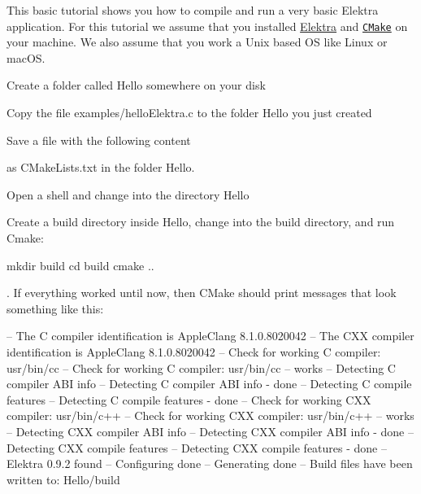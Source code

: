 This basic tutorial shows you how to compile and run a very basic Elektra application. For this tutorial we assume that you installed \hyperlink{doc_INSTALL_md}{Elektra} and \href{http://cmake.org}{\tt C\+Make} on your machine. We also assume that you work a Unix based OS like Linux or mac\+OS.


\begin{DoxyEnumerate}
\item Create a folder called {\ttfamily Hello} somewhere on your disk
\item Copy the file {\ttfamily examples/hello\+Elektra.\+c} to the folder {\ttfamily Hello} you just created
\item Save a file with the following content
\end{DoxyEnumerate}




as {\ttfamily C\+Make\+Lists.\+txt} in the folder {\ttfamily Hello}.


\begin{DoxyEnumerate}
\item Open a shell and change into the directory {\ttfamily Hello}
\item Create a build directory inside {\ttfamily Hello}, change into the build directory, and run Cmake\+:
\end{DoxyEnumerate}


\begin{DoxyCode}
mkdir build
cd build
cmake ..
\end{DoxyCode}


. If everything worked until now, then C\+Make should print messages that look something like this\+:


\begin{DoxyCode}
-- The C compiler identification is AppleClang 8.1.0.8020042
-- The CXX compiler identification is AppleClang 8.1.0.8020042
-- Check for working C compiler: usr/bin/cc
-- Check for working C compiler: usr/bin/cc -- works
-- Detecting C compiler ABI info
-- Detecting C compiler ABI info - done
-- Detecting C compile features
-- Detecting C compile features - done
-- Check for working CXX compiler: usr/bin/c++
-- Check for working CXX compiler: usr/bin/c++ -- works
-- Detecting CXX compiler ABI info
-- Detecting CXX compiler ABI info - done
-- Detecting CXX compile features
-- Detecting CXX compile features - done
-- Elektra 0.9.2 found
-- Configuring done
-- Generating done
-- Build files have been written to: Hello/build
\end{DoxyCode}



